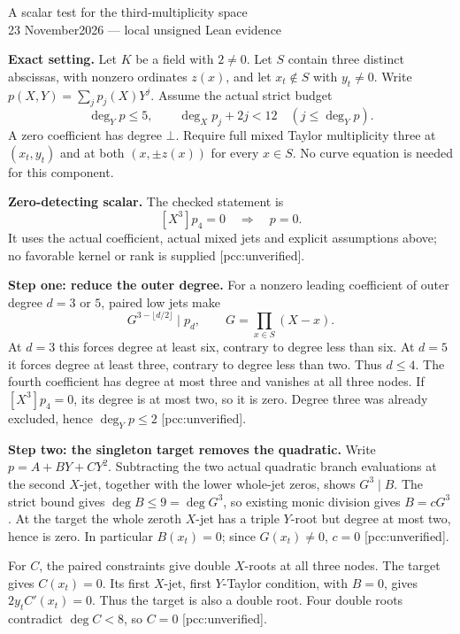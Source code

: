 \documentclass[10pt]{article}
\begin{document}
\begin{center}{\Large A scalar test for the third-multiplicity space}\\[4pt]
23 November2026 --- local unsigned Lean evidence\end{center}
\textbf{Exact setting.}
Let $K$ be a field with $2\ne0$. Let $S$ contain three distinct abscissas,
with nonzero ordinates $z(x)$, and let $x_t\notin S$ with $y_t\ne0$.
Write $p(X,Y)=\sum_j p_j(X)Y^j$. Assume the actual strict budget
\[
 \deg_Yp\le5,\qquad \deg_Xp_j+2j<12\quad(j\le\deg_Yp).
\]
A zero coefficient has degree $\bot$. Require full mixed Taylor multiplicity
three at $(x_t,y_t)$ and at both $(x,\pm z(x))$ for every $x\in S$.
No curve equation is needed for this component.

\textbf{Zero-detecting scalar.}
The checked statement is
\[
 [X^3]p_4=0\quad\Longrightarrow\quad p=0.
\]
It uses the actual coefficient, actual mixed jets and explicit assumptions
above; no favorable kernel or rank is supplied [pcc:unverified].

\textbf{Step one: reduce the outer degree.}
For a nonzero leading coefficient of outer degree $d=3$ or $5$,
paired low jets make
\[
 G^{3-\lfloor d/2\rfloor}\mid p_d,
 \qquad G=\prod_{x\in S}(X-x).
\]
At $d=3$ this forces degree at least six, contrary to degree less than six.
At $d=5$ it forces degree at least three, contrary to degree less than two.
Thus $d\le4$. The fourth coefficient has degree at most three and vanishes
at all three nodes. If $[X^3]p_4=0$, its degree is at most two, so it is zero.
Degree three was already excluded, hence $\deg_Yp\le2$ [pcc:unverified].

\textbf{Step two: the singleton target removes the quadratic.}
Write $p=A+BY+CY^2$. Subtracting the two actual quadratic branch evaluations
at the second $X$-jet, together with the lower whole-jet zeros, shows
$G^3\mid B$. The strict bound gives $\deg B\le9=\deg G^3$,
so existing monic division gives $B=cG^3$. At the target the whole zeroth
$X$-jet has a triple $Y$-root but degree at most two, hence is zero.
In particular $B(x_t)=0$; since $G(x_t)\ne0$, $c=0$ [pcc:unverified].

For $C$, the paired constraints give double $X$-roots at all three nodes.
The target gives $C(x_t)=0$. Its first $X$-jet, first $Y$-Taylor condition,
with $B=0$, gives $2y_tC'(x_t)=0$. Thus the target is also a double root.
Four double roots contradict $\deg C<8$, so $C=0$ [pcc:unverified].
\end{document}
